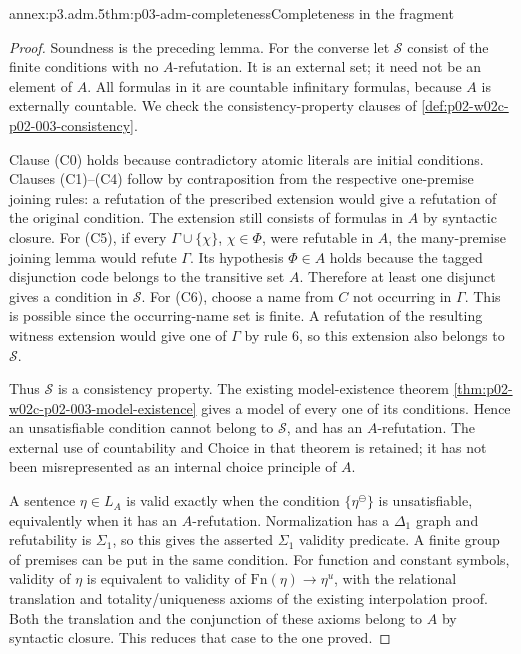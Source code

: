 \begin{annexitem}{annex:p3.adm.5}{thm:p03-adm-completeness}{Completeness in the fragment}
\begin{proof}
Soundness is the preceding lemma. For the converse let \(\mathcal S\)
consist of the finite conditions with no \(A\)-refutation. It is an
external set; it need not be an element of \(A\). All formulas in it
are countable infinitary formulas, because \(A\) is externally countable.
We check the consistency-property clauses of
\cref{def:p02-w02c-p02-003-consistency}.

Clause (C0) holds because contradictory atomic literals are initial
conditions. Clauses (C1)--(C4) follow by contraposition from the respective
one-premise joining rules: a refutation of the prescribed extension
would give a refutation of the original condition. The extension still
consists of formulas in \(A\) by syntactic closure. For (C5), if every
\(\Gamma\cup\{\chi\}\), \(\chi\in\Phi\), were refutable in \(A\),
the many-premise joining lemma would refute \(\Gamma\). Its hypothesis
\(\Phi\in A\) holds because the tagged disjunction code belongs to the
transitive set \(A\). Therefore at least one disjunct gives a condition
in \(\mathcal S\). For (C6), choose a name from \(C\) not occurring
in \(\Gamma\). This is possible since the occurring-name set is finite.
A refutation of the resulting witness extension would give one of
\(\Gamma\) by rule 6, so this extension also belongs to \(\mathcal S\).

Thus \(\mathcal S\) is a consistency property. The existing model-existence
theorem \cref{thm:p02-w02c-p02-003-model-existence} gives a model of every
one of its conditions. Hence an unsatisfiable condition cannot belong
to \(\mathcal S\), and has an \(A\)-refutation. The external use of
countability and Choice in that theorem is retained; it has not been
misrepresented as an internal choice principle of \(A\).

A sentence \(\eta\in L_A\) is valid exactly when the condition
\(\{\eta^{\ominus}\}\) is unsatisfiable, equivalently when it has an
\(A\)-refutation. Normalization has a \(\Delta_1\) graph and refutability
is \(\Sigma_1\), so this gives the asserted \(\Sigma_1\) validity
predicate. A finite group of premises can be put in the same condition.
For function and constant symbols, validity of \(\eta\) is equivalent
to validity of \(\mathrm{Fn}(\eta)\to\eta^u\), with the relational
translation and totality/uniqueness axioms of the existing interpolation
proof. Both the translation and the conjunction of these axioms belong
to \(A\) by syntactic closure. This reduces that case to the one proved.
\end{proof}
\end{annexitem}

